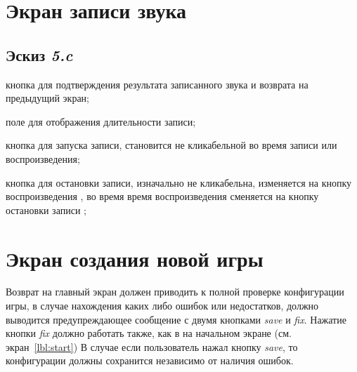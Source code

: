 \section{Экран записи звука}\label{lbl:sound-record}

\subsection{Эскиз \emph{5.c}}

\begin{enumerate*}
    \item кнопка для подтверждения результата записанного звука и возврата на предыдущий экран;
    \item поле для отображения длительности записи;
    \item кнопка для запуска записи, становится не кликабельной во время записи или воспроизведения;
    \item кнопка для остановки записи, изначально не кликабельна, изменяется на кнопку воспроизведения \faPlay, во время время воспроизведения сменяется на кнопку остановки записи \faStop; 
\end{enumerate*}

\section{Экран создания новой игры}\label{lbl:game-new}

Возврат на главный экран должен приводить к полной проверке конфигурации игры, в случае нахождения каких либо ошибок или недостатков, должно выводится предупреждающее сообщение с двумя кнопками \emph{save} и \emph{fix}. Нажатие кнопки \emph{fix} должно работать также, как в на начальном экране (см. экран~\ref{lbl:start}) В случае если пользователь нажал кнопку \emph{save}, то конфигурации должны сохранится независимо от наличия ошибок.

